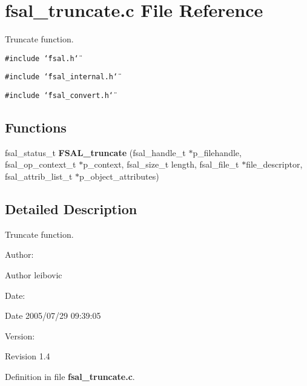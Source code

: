 \section{fsal\_\-truncate.c File Reference}
\label{fsal__truncate_8c}
Truncate function.  


{\tt \#include \char`\"{}fsal.h\char`\"{}}\par
{\tt \#include \char`\"{}fsal\_\-internal.h\char`\"{}}\par
{\tt \#include \char`\"{}fsal\_\-convert.h\char`\"{}}\par
\subsection*{Functions}
\begin{CompactItemize}
\item 
fsal\_\-status\_\-t {\bf FSAL\_\-truncate} (fsal\_\-handle\_\-t $\ast$p\_\-filehandle, fsal\_\-op\_\-context\_\-t $\ast$p\_\-context, fsal\_\-size\_\-t length, fsal\_\-file\_\-t $\ast$file\_\-descriptor, fsal\_\-attrib\_\-list\_\-t $\ast$p\_\-object\_\-attributes)
\end{CompactItemize}


\subsection{Detailed Description}
Truncate function. 

\begin{Desc}
\item[Author:]\end{Desc}
\begin{Desc}
\item[Author]leibovic \end{Desc}
\begin{Desc}
\item[Date:]\end{Desc}
\begin{Desc}
\item[Date]2005/07/29 09:39:05 \end{Desc}
\begin{Desc}
\item[Version:]\end{Desc}
\begin{Desc}
\item[Revision]1.4 \end{Desc}


Definition in file {\bf fsal\_\-truncate.c}.

